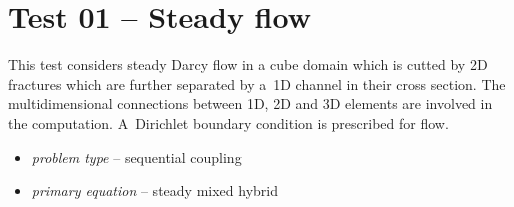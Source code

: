 %
%
%
%




\section{Test 01 -- Steady flow}
\label{sec:test01}
This test considers steady Darcy flow in a cube domain which is cutted by 2D fractures which are further 
separated by a~1D channel in their cross section. The multidimensional connections between 1D, 2D and 3D 
elements are involved in the computation. A~Dirichlet boundary condition is prescribed for flow.
  \begin{itemize} 
    \item \emph{problem type} -- sequential coupling
    \item \emph{primary equation} -- steady mixed hybrid
  \end{itemize}

